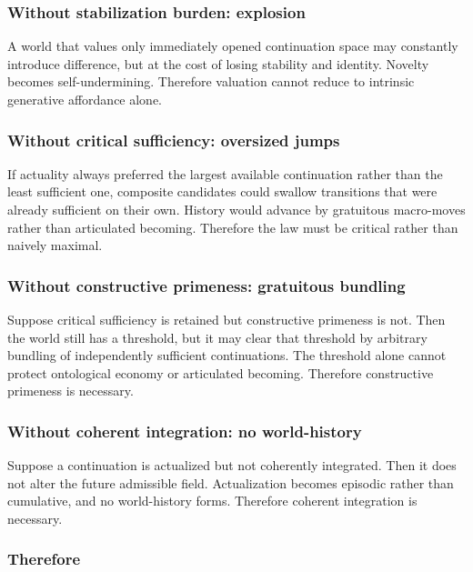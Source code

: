 \documentclass[11pt]{article}
\theoremstyle{foundation}
\begin{document}
\subsubsection{Without stabilization burden: explosion}

A world that values only immediately opened continuation space may constantly introduce difference, but at the cost of losing stability and identity. Novelty becomes self-undermining. Therefore valuation cannot reduce to intrinsic generative affordance alone.

\subsubsection{Without critical sufficiency: oversized jumps}

If actuality always preferred the largest available continuation rather than the least sufficient one, composite candidates could swallow transitions that were already sufficient on their own. History would advance by gratuitous macro-moves rather than articulated becoming. Therefore the law must be critical rather than naively maximal.

\subsubsection{Without constructive primeness: gratuitous bundling}

Suppose critical sufficiency is retained but constructive primeness is not. Then the world still has a threshold, but it may clear that threshold by arbitrary bundling of independently sufficient continuations. The threshold alone cannot protect ontological economy or articulated becoming. Therefore constructive primeness is necessary.

\subsubsection{Without coherent integration: no world-history}

Suppose a continuation is actualized but not coherently integrated. Then it does not alter the future admissible field. Actualization becomes episodic rather than cumulative, and no world-history forms. Therefore coherent integration is necessary.

\subsubsection{Therefore}
\end{document}
